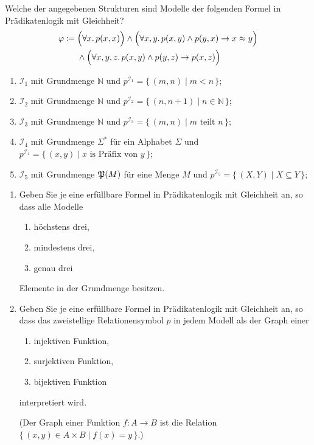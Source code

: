 \documentclass[german]{latteachCD}[2017/03/28]
\begin{document}
\clearpage

\enlargethispage{4\baselineskip}

\setcounter{exercise}{0}

\begin{exercise}
  Welche der angegebenen Strukturen sind Modelle der folgenden Formel in
  Prädikatenlogik mit Gleichheit?
  \begin{align*}
    \phi \coloneqq{}
    & \Bigl(\forall x.\, p(x,x)\Bigr) \land \Bigl(\forall x, y.\, p(x,y) \land
      p(y,x) \to x \approx y\Bigr)\\
    &\land \Bigl(\forall x, y, z.\, p(x,y) \land p(y,z) \to p(x,z)\Bigr)
  \end{align*}
  \begin{enumerate}
  \item $\mathcal{I}_{1}$ mit Grundmenge $\mathbb N$ und $p^{\mathcal{I}_{1}} =
    \{\,(m,n) \mid m < n \,\}$;
  \item $\mathcal{I}_{2}$ mit Grundmenge $\mathbb N$ und $p^{\mathcal{I}_{2}} =
    \{\,(n,n+1) \mid n \in \mathbb N \,\}$;
  \item $\mathcal{I}_{3}$ mit Grundmenge $\mathbb N$ und $p^{\mathcal{I}_{3}} =
    \{\,(m,n) \mid m \text{ teilt } n\,\}$;
  \item $\mathcal{I}_{4}$ mit Grundmenge $\Sigma^{*}$ für ein Alphabet $\Sigma$
    und $p^{\mathcal{I}_{4}} = \{\,(x,y) \mid x \text{ is Präfix von } y\,\}$;
  \item $\mathcal{I}_{5}$ mit Grundmenge $\subsets{M}$ für eine Menge $M$ und
    $p^{\mathcal{I}_{5}} = \{\,(X,Y) \mid X \subseteq Y\,\}$;
  \end{enumerate}
\end{exercise}

\begin{exercise}
  \begin{enumerate}
  \item Geben Sie je eine erfüllbare Formel in Prädikatenlogik mit Gleichheit
    an, so dass alle Modelle
    \begin{enumerate}
    \item höchstens drei,
    \item mindestens drei,
    \item genau drei
    \end{enumerate}
    Elemente in der Grundmenge besitzen.
  \item Geben Sie je eine erfüllbare Formel in Prädikatenlogik mit Gleichheit
    an, so dass das zweistellige Relationensymbol $p$ in jedem Modell als der
    Graph einer
    \begin{enumerate}
    \item injektiven Funktion,
    \item surjektiven Funktion,
    \item bijektiven Funktion
    \end{enumerate}
    interpretiert wird.

    (Der Graph einer Funktion $f \colon A \to B$ ist die Relation $\{\,(x,y) \in
    A \times B \mid f(x) = y\,\}$.)
  \end{enumerate}
\end{exercise}
\end{document}
